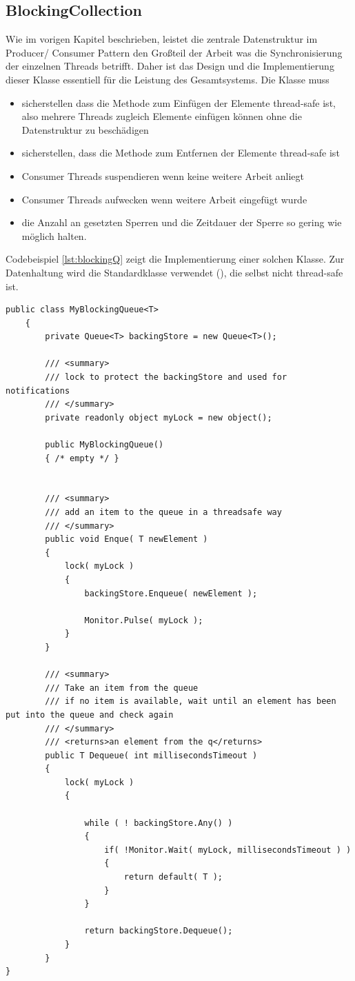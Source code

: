 \subsection{BlockingCollection}\label{sec:blockingq}
Wie im vorigen Kapitel beschrieben, leistet die zentrale Datenstruktur im Producer/ Consumer Pattern den Großteil der Arbeit was die Synchronisierung der einzelnen Threads betrifft. Daher ist das Design und die Implementierung dieser Klasse essentiell für die Leistung des Gesamtsystems. Die Klasse muss
\begin{itemize}
	\item sicherstellen dass die Methode zum Einfügen der Elemente thread-safe ist, also mehrere Threads zugleich Elemente einfügen können ohne die Datenstruktur zu beschädigen
	\item sicherstellen, dass die Methode zum Entfernen der Elemente thread-safe ist
	\item Consumer Threads suspendieren wenn keine weitere Arbeit anliegt
	\item Consumer Threads aufwecken wenn weitere Arbeit eingefügt wurde
	\item die Anzahl an gesetzten Sperren und die Zeitdauer der Sperre so gering wie möglich halten.
\end{itemize}
Codebeispiel \ref{lst:blockingQ} zeigt die Implementierung einer solchen Klasse. Zur Datenhaltung wird die Standardklasse  verwendet (), die selbst nicht thread-safe ist.
\begin{lstlisting}[caption={Implementierung BlockingQ, siehe MyBlockingQ.cs}, label={lst:blockingQ}, captionpos=b]
    public class MyBlockingQueue<T>
	{
		private Queue<T> backingStore = new Queue<T>();

		/// <summary>
		/// lock to protect the backingStore and used for notifications
		/// </summary>
		private readonly object myLock = new object();

		public MyBlockingQueue()
		{ /* empty */ }


		/// <summary>
		/// add an item to the queue in a threadsafe way
		/// </summary>
		public void Enque( T newElement )
		{
			lock( myLock )
			{
				backingStore.Enqueue( newElement );

				Monitor.Pulse( myLock );
			}
		}

		/// <summary>
		/// Take an item from the queue
		/// if no item is available, wait until an element has been put into the queue and check again
		/// </summary>
		/// <returns>an element from the q</returns>
		public T Dequeue( int millisecondsTimeout )
		{
			lock( myLock )
			{

				while ( ! backingStore.Any() )
				{
					if( !Monitor.Wait( myLock, millisecondsTimeout ) )
					{
						return default( T );
					}
				}

				return backingStore.Dequeue();
			}
		}
}
\end{lstlisting}
